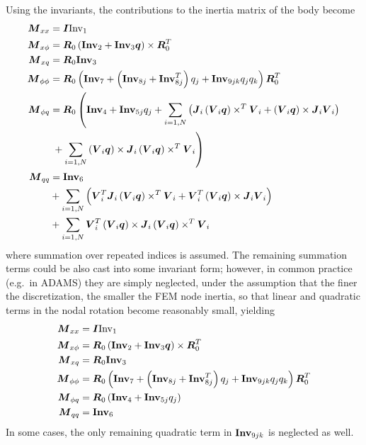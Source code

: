 Using the invariants, the contributions to the inertia matrix of the body
become
\begin{align}
	\boldsymbol{M}_{xx}	&= \boldsymbol{I} \mathrm{Inv}_1 \\
	\boldsymbol{M}_{x\phi}	&= \boldsymbol{R}_0 \left( 
		\boldsymbol{\mathrm{Inv}}_2 + \boldsymbol{\mathrm{Inv}}_3 \boldsymbol{q} \right)\times{}  \boldsymbol{R}_0^T \\
	\boldsymbol{M}_{xq}	&= \boldsymbol{R}_0 \boldsymbol{\mathrm{Inv}}_3 \\
	\boldsymbol{M}_{\phi\phi}&= \boldsymbol{R}_0 \left( 
		\boldsymbol{\mathrm{Inv}}_7
		+ \left( \boldsymbol{\mathrm{Inv}}_{8j} + \boldsymbol{\mathrm{Inv}}_{8j}^T \right) q_j
		+ \boldsymbol{\mathrm{Inv}}_{9jk} q_j q_k
	 \right) \boldsymbol{R}_0^T \\
	\boldsymbol{M}_{\phi q}	&= \boldsymbol{R}_0 \left( 
		\boldsymbol{\mathrm{Inv}}_4
		+ \boldsymbol{\mathrm{Inv}}_{5j} q_j 
		+ \sum_{i=1,N} \left( 
			\boldsymbol{J}_i \left( \boldsymbol{V}_i \boldsymbol{q} \right)\times^T \boldsymbol{V}_i
			+ \left( \boldsymbol{V}_i \boldsymbol{q} \right)\times \boldsymbol{J}_i \boldsymbol{V}_i
		 \right)
	 \right. \nonumber \\
			& \left.  \mbox{} + \sum_{i=1,N} \left( \boldsymbol{V}_i \boldsymbol{q} \right)\times \boldsymbol{J}_i \left( \boldsymbol{V}_i \boldsymbol{q} \right)\times^T \boldsymbol{V}_i
	 \right) \\
	\boldsymbol{M}_{qq}	&= \boldsymbol{\mathrm{Inv}}_6 \nonumber \\
			& \mbox{} + \sum_{i=1,N} \left( 
			\boldsymbol{V}_i^T \boldsymbol{J}_i \left( \boldsymbol{V}_i \boldsymbol{q} \right)\times^T \boldsymbol{V}_i
			+ \boldsymbol{V}_i^T \left( \boldsymbol{V}_i \boldsymbol{q} \right)\times \boldsymbol{J}_i \boldsymbol{V}_i
	 \right) \nonumber \\
			& \mbox{} + \sum_{i=1,N}
			\boldsymbol{V}_i^T \left( \boldsymbol{V}_i \boldsymbol{q} \right)\times \boldsymbol{J}_i \left( \boldsymbol{V}_i \boldsymbol{q} \right)\times^T \boldsymbol{V}_i
\end{align}
where summation over repeated indices is assumed.
The remaining summation terms could be also cast into some invariant form;
however, in common practice (e.g.\ in ADAMS) they are simply neglected,
under the assumption that the finer the discretization, the smaller 
the FEM node inertia, so that linear and quadratic terms 
in the nodal rotation become reasonably small, yielding
\begin{align}
	\boldsymbol{M}_{xx}	&= \boldsymbol{I} \mathrm{Inv}_1 \\
	\boldsymbol{M}_{x\phi}	&= \boldsymbol{R}_0 \left( 
		\boldsymbol{\mathrm{Inv}}_2 + \boldsymbol{\mathrm{Inv}}_3 \boldsymbol{q} \right)\times{}  \boldsymbol{R}_0^T \\
	\boldsymbol{M}_{xq}	&= \boldsymbol{R}_0 \boldsymbol{\mathrm{Inv}}_3 \\
	\boldsymbol{M}_{\phi\phi}&= \boldsymbol{R}_0 \left( 
		\boldsymbol{\mathrm{Inv}}_7
		+ \left( \boldsymbol{\mathrm{Inv}}_{8j} + \boldsymbol{\mathrm{Inv}}_{8j}^T \right) q_j
		+ \boldsymbol{\mathrm{Inv}}_{9jk} q_j q_k
	 \right) \boldsymbol{R}_0^T \\
	\boldsymbol{M}_{\phi q}	&= \boldsymbol{R}_0 \left( 
		\boldsymbol{\mathrm{Inv}}_4
		+ \boldsymbol{\mathrm{Inv}}_{5j} q_j 
	 \right) \\
	\boldsymbol{M}_{qq}	&= \boldsymbol{\mathrm{Inv}}_6 
\end{align}
In some cases, the only remaining quadratic term in $\boldsymbol{\mathrm{Inv}}_{9jk}$
is neglected as well.



